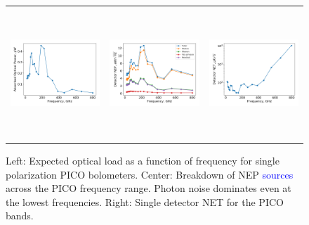 \documentclass[]{spie}  %
\newcommand{\comb}[1]{\textcolor{blue}{#1}}
\begin{document}
\begin{figure} [ht]
\begin{center}
\begin{tabular}{ccc} %
\hspace{-1.4cm} \includegraphics[height=4.9cm]{system_Popt.png} & \hspace{-0.7cm} \includegraphics[height=4.9cm]{system_NEP.png} &\hspace{-0.7cm}  \includegraphics[height=4.9cm]{system_NET.png} 
\end{tabular}
\end{center}
\caption{ \label{fig:popt} \label{fig:noise} \label{fig:net} 
Left: Expected optical load as a function of frequency for single polarization PICO bolometers. 
Center: Breakdown of NEP \comb{sources} across the PICO frequency range.  Photon noise dominates even at the lowest frequencies. 
Right: Single detector NET for the PICO bands. 
}
\end{figure} 
\end{document}
